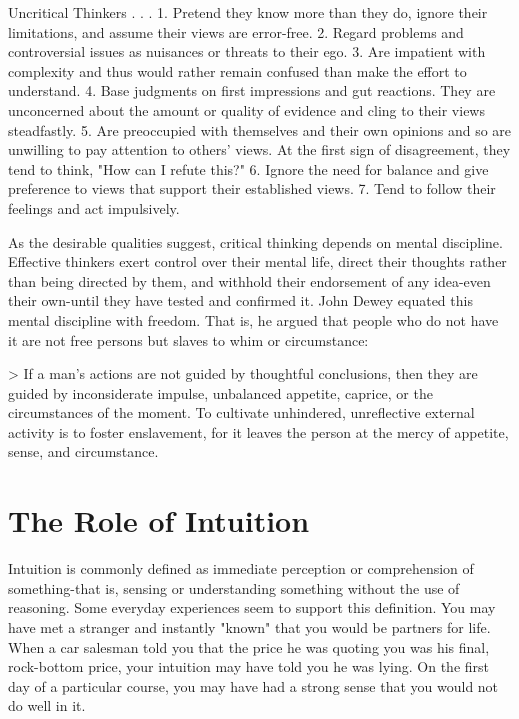 \documentclass{book}
\begin{document}
Uncritical Thinkers . . .
1. Pretend they know more than they do, ignore their limitations, and assume their views are error-free.
2. Regard problems and controversial issues as nuisances or threats to their ego.
3. Are impatient with complexity and thus would rather remain confused than make the effort to understand.
4. Base judgments on first impressions and gut reactions. They are unconcerned about the amount or quality of evidence and cling to their views steadfastly.
5. Are preoccupied with themselves and their own opinions and so are unwilling to pay attention to others’ views. At the first sign of disagreement, they tend to think, "How can I refute this?"
6. Ignore the need for balance and give preference to views that support their established views.
7. Tend to follow their feelings and act impulsively.

As the desirable qualities suggest, critical thinking depends on mental discipline. Effective thinkers exert control over their mental life, direct their thoughts rather than being directed by them, and withhold their endorsement of any idea-even their own-until they have tested and confirmed it. John Dewey equated this mental discipline with freedom. That is, he argued that people who do not have it are not free persons but slaves to whim or circumstance:

> If a man’s actions are not guided by thoughtful conclusions, then they are guided by inconsiderate impulse, unbalanced appetite, caprice, or the circumstances of the moment. To cultivate unhindered, unreflective external activity is to foster enslavement, for it leaves the person at the mercy of appetite, sense, and circumstance.

\section{The Role of Intuition}

Intuition is commonly defined as immediate perception or comprehension of something-that is, sensing or understanding something without the use of reasoning. Some everyday experiences seem to support this definition. You may have met a stranger and instantly "known" that you would be partners for life. When a car salesman told you that the price he was quoting you was his final, rock-bottom price, your intuition may have told you he was lying. On the first day of a particular course, you may have had a strong sense that you would not do well in it.
\end{document}
